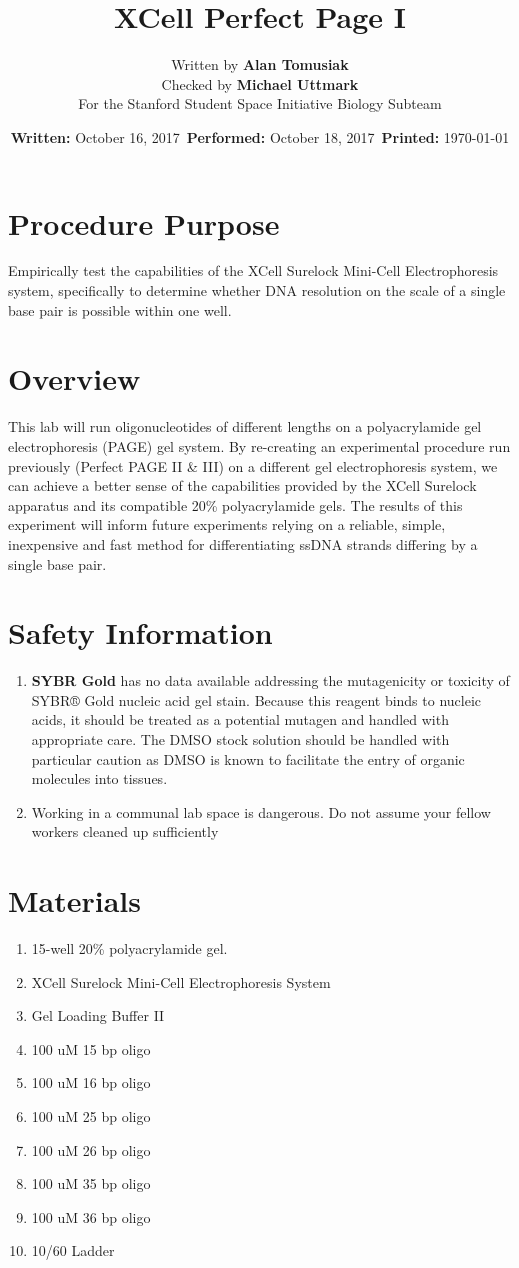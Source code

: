 \documentclass[letterpaper]{article}
\title{XCell Perfect Page I} %
\author{Written by \textbf{Alan Tomusiak}\\ %
		Checked by \textbf{Michael Uttmark}\\%
        For the Stanford Student Space Initiative Biology Subteam}
\date{\textbf{Written:} October 16, 2017 \,\textbf{Performed:} October 18, 2017 \,\textbf{Printed:} \today{}}
\newenvironment{safety}{%
\begin{tcolorbox}[width=\textwidth, colframe=safetyFrame, arc=1.5mm]
}%
{\end{tcolorbox}}
\newcommand{\B}[1]{\textbf{#1}}
\newcommand{\SYBRGOLD}{\item{\B{SYBR Gold} has no data available addressing the mutagenicity or toxicity of SYBR® Gold nucleic acid gel stain. Because this reagent binds to nucleic acids, it should be treated as a potential mutagen and handled with appropriate care. The DMSO stock solution should be handled with particular caution as DMSO is known to facilitate the entry of organic molecules into tissues.\cite{sybrGold}}}
\begin{document}
\maketitle
\section{Procedure Purpose} %
Empirically test the capabilities of the XCell Surelock Mini-Cell Electrophoresis system, specifically to determine whether DNA resolution on the scale of a single base pair is possible within one well. 

\section{Overview} %
This lab will run oligonucleotides of different lengths on a polyacrylamide gel electrophoresis (PAGE) gel system. By re-creating an experimental procedure run previously (Perfect PAGE II \& III) on a different gel electrophoresis system, we can achieve a better sense of the capabilities provided by the XCell Surelock apparatus and its compatible 20\% polyacrylamide gels. The results of this experiment will inform future experiments relying on a reliable, simple, inexpensive and fast method for differentiating ssDNA strands differing by a single base pair. 

\section{Safety Information}
\begin{safety}
\begin{enumerate}
\SYBRGOLD{} %
\item{Working in a communal lab space is dangerous. Do not assume your fellow workers cleaned up sufficiently}
\end{enumerate}
\end{safety}

\section{Materials}
\begin{enumerate}
\item{15-well 20\% polyacrylamide gel.}
\item{XCell Surelock Mini-Cell Electrophoresis System}
\item{Gel Loading Buffer II}
\item{100 uM 15 bp oligo}
\item{100 uM 16 bp oligo}
\item{100 uM 25 bp oligo}
\item{100 uM 26 bp oligo}
\item{100 uM 35 bp oligo}
\item{100 uM 36 bp oligo}
\item{10/60 Ladder}
\end{enumerate}
\end{document}
